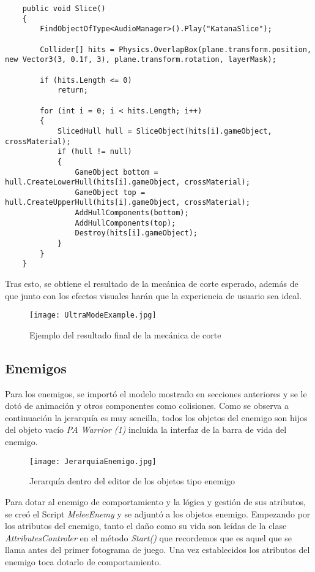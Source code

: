 \begin{lstlisting}
    public void Slice()
    {
        FindObjectOfType<AudioManager>().Play("KatanaSlice");

        Collider[] hits = Physics.OverlapBox(plane.transform.position, new Vector3(3, 0.1f, 3), plane.transform.rotation, layerMask);

        if (hits.Length <= 0)
            return;

        for (int i = 0; i < hits.Length; i++)
        {
            SlicedHull hull = SliceObject(hits[i].gameObject, crossMaterial);
            if (hull != null)
            {
                GameObject bottom = hull.CreateLowerHull(hits[i].gameObject, crossMaterial);
                GameObject top = hull.CreateUpperHull(hits[i].gameObject, crossMaterial);
                AddHullComponents(bottom);
                AddHullComponents(top);
                Destroy(hits[i].gameObject);
            }
        }
    }
\end{lstlisting}

Tras esto, se obtiene el resultado de la mecánica de corte esperado, además de que junto con los efectos visuales harán que la experiencia de usuario sea ideal.

\begin{figure}[H]
    \centering
    \texttt{[image: UltraModeExample.jpg]}
    \caption{Ejemplo del resultado final de la mecánica de corte}
\end{figure}

\subsection{Enemigos}

Para los enemigos, se importó el modelo mostrado en secciones anteriores y se le dotó de animación y otros componentes como colisiones. Como se observa a continuación la jerarquía es muy sencilla, todos los objetos del enemigo son hijos del objeto vacío \textit{PA Warrior (1)} incluida la interfaz de la barra de vida del enemigo.

\begin{figure}[H]
    \centering
    \texttt{[image: JerarquiaEnemigo.jpg]}
    \caption{Jerarquía dentro del editor de los objetos tipo enemigo}
\end{figure}

Para dotar al enemigo de comportamiento y la lógica y gestión de sus atributos, se creó el Script \textit{MeleeEnemy} y se adjuntó a los objetos enemigo. Empezando por los atributos del enemigo, tanto el daño como su vida son leídas de la clase \textit{AttributesControler} en el método \textit{Start()} que recordemos que es aquel que se llama antes del primer fotograma de juego. Una vez establecidos los atributos del enemigo toca dotarlo de comportamiento.

